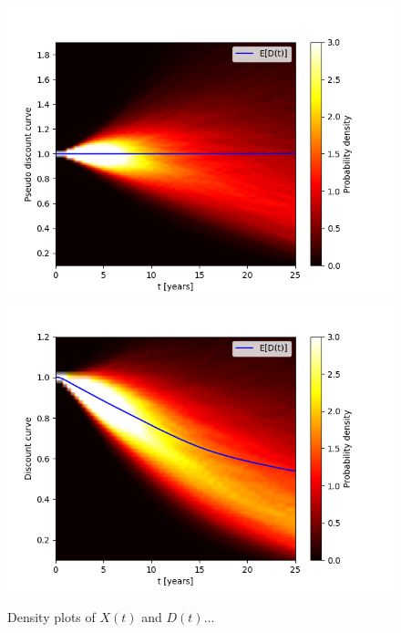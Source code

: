 \begin{figure}
\centering
\includegraphics[scale=0.7]{figures/pseudo_discount_density.png}
\includegraphics[scale=0.7]{figures/discount_density.png}
\caption{Density plots of $X(t)$ and $D(t)$...}
\end{figure}

